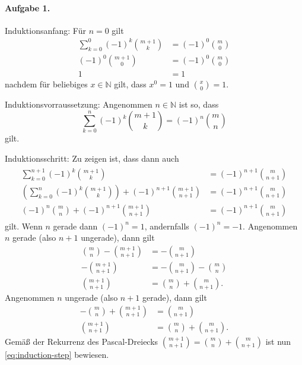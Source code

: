 \documentclass{article}
\begin{document}
\paragraph{Aufgabe 1.}

Induktionsanfang: Für $n = 0$ gilt
\begin{align*}
    \sum_{k = 0}^{0} (-1)^k {{m + 1}\choose{k}}
    &=
    (-1)^0 {{m}\choose{0}}
    \\
    (-1)^0 {{m + 1}\choose{0}}
    &=
    (-1)^0 {{m}\choose{0}}
    \\
    1 &= 1
\end{align*}
nachdem für beliebiges $x \in \mathbb{N}$ gilt, dass $x^0 = 1$ und ${{x}\choose{0}} = 1$.

Induktionsvorraussetzung: Angenommen $n \in \mathbb{N}$ ist so, dass
\begin{equation*}
    \sum_{k = 0}^{n} (-1)^k {{m + 1}\choose{k}} = (-1)^n {{m}\choose{n}}
\end{equation*}
gilt.

Induktionsschritt: Zu zeigen ist, dass dann auch
\begin{gather}
    \label{eq:induction-step}
    \begin{aligned}
        \sum_{k = 0}^{n + 1} (-1)^k {{m + 1}\choose{k}} &= (-1)^{n + 1} {{m}\choose{n + 1}} \\
        \left( \sum_{k = 0}^{n} (-1)^k {{m + 1}\choose{k}} \right) + (-1)^{n + 1} {{m + 1}\choose{n + 1}}
        &=
        (-1)^{n + 1} {{m}\choose{n + 1}} \\
        (-1)^n {{m}\choose{n}} + (-1)^{n + 1} {{m + 1}\choose{n + 1}} &= (-1)^{n + 1} {{m}\choose{n + 1}}
    \end{aligned}
\end{gather}
gilt. Wenn $n$ gerade dann $(-1)^n = 1$, andernfalls $(-1)^n = -1$. Angenommen $n$ gerade (also $n + 1$ ungerade), dann gilt
\begin{align*}
    {{m}\choose{n}} - {{m + 1}\choose{n + 1}} &= -{{m}\choose{n + 1}} \\
    -{{m + 1}\choose{n + 1}} &= -{{m}\choose{n + 1}} - {{m}\choose{n}} \\
    {{m + 1}\choose{n + 1}} &= {{m}\choose{n}} + {{m}\choose{n + 1}}.
\end{align*}
Angenommen $n$ ungerade (also $n + 1$ gerade), dann gilt
\begin{align*}
    -{{m}\choose{n}} + {{m + 1}\choose{n + 1}} &= {{m}\choose{n + 1}} \\
    {{m + 1}\choose{n + 1}} &= {{m}\choose{n}} + {{m}\choose{n + 1}}.
\end{align*}
Gemäß der Rekurrenz des Pascal-Dreiecks ${{m + 1}\choose{n + 1}} = {{m}\choose{n}} + {{m}\choose{n + 1}}$ ist nun \eqref{eq:induction-step} bewiesen.
\end{document}
